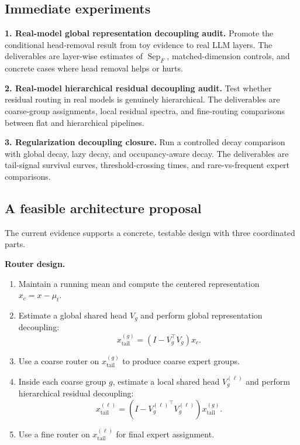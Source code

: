 \documentclass[11pt]{article}
\begin{document}
\subsection{Immediate experiments}

\textbf{1. Real-model global representation decoupling audit.}  
Promote the conditional head-removal result from toy evidence to real LLM layers. The deliverables are layer-wise estimates of $\operatorname{Sep}_F$, matched-dimension controls, and concrete cases where head removal helps or hurts.

\textbf{2. Real-model hierarchical residual decoupling audit.}  
Test whether residual routing in real models is genuinely hierarchical. The deliverables are coarse-group assignments, local residual spectra, and fine-routing comparisons between flat and hierarchical pipelines.

\textbf{3. Regularization decoupling closure.}  
Run a controlled decay comparison with global decay, lazy decay, and occupancy-aware decay. The deliverables are tail-signal survival curves, threshold-crossing times, and rare-vs-frequent expert comparisons.

\subsection{A feasible architecture proposal}

The current evidence supports a concrete, testable design with three coordinated parts.

\textbf{Router design.}
\begin{enumerate}[leftmargin=1.5em]
    \item Maintain a running mean and compute the centered representation $x_c = x - \mu_t$.
    \item Estimate a global shared head $V_g$ and perform global representation decoupling:
    \[
    x_{\text{tail}}^{(g)} = (I - V_g^\top V_g)x_c .
    \]
    \item Use a coarse router on $x_{\text{tail}}^{(g)}$ to produce coarse expert groups.
    \item Inside each coarse group $g$, estimate a local shared head $V_g^{(\ell)}$ and perform hierarchical residual decoupling:
    \[
    x_{\text{tail}}^{(\ell)} = (I - {V_g^{(\ell)}}^\top V_g^{(\ell)}) x_{\text{tail}}^{(g)} .
    \]
    \item Use a fine router on $x_{\text{tail}}^{(\ell)}$ for final expert assignment.
\end{enumerate}
\end{document}
